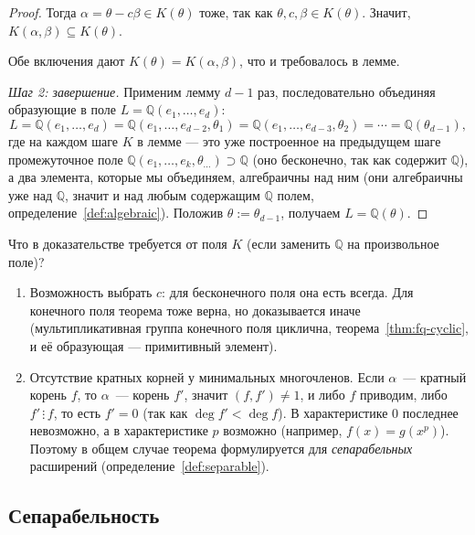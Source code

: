 \documentclass[12pt]{article}
\begin{document}
\begin{proof}
    	Тогда $\alpha = \theta-c\beta \in K(\theta)$ тоже, так как $\theta,c,\beta \in K(\theta)$. Значит, $K(\alpha,\beta)\subseteq K(\theta)$.
    
    	Обе включения дают $K(\theta)=K(\alpha,\beta)$, что и требовалось в лемме.
    
    	\smallskip
    	\emph{Шаг 2: завершение.} Применим лемму $d-1$ раз, последовательно объединяя образующие в поле $L=\mathbb{Q}(e_1,\ldots,e_d)$:
    	\[
    	L = \mathbb{Q}(e_1,\ldots,e_d) = \mathbb{Q}(e_1,\ldots,e_{d-2},\theta_1) = \mathbb{Q}(e_1,\ldots,e_{d-3},\theta_2) = \cdots = \mathbb{Q}(\theta_{d-1}),
    	\]
    	где на каждом шаге $K$ в лемме --- это уже построенное на предыдущем шаге промежуточное поле $\mathbb{Q}(e_1,\ldots,e_k,\theta_{\ldots})\supset\mathbb{Q}$ (оно бесконечно, так как содержит $\mathbb{Q}$), а два элемента, которые мы объединяем, алгебраичны над ним (они алгебраичны уже над $\mathbb{Q}$, значит и над любым содержащим $\mathbb{Q}$ полем, определение~\ref{def:algebraic}). Положив $\theta := \theta_{d-1}$, получаем $L = \mathbb{Q}(\theta)$.
    \end{proof}

    \begin{note}
    	Что в доказательстве требуется от поля $K$ (если заменить $\mathbb{Q}$ на произвольное поле)?
    	\begin{enumerate}
    		\item Возможность выбрать $c$: для бесконечного поля она есть всегда. Для конечного поля теорема тоже верна, но доказывается иначе (мультипликативная группа конечного поля циклична, теорема~\ref{thm:fq-cyclic}, и её образующая --- примитивный элемент).
    		\item Отсутствие кратных корней у минимальных многочленов. Если $\alpha$~--- кратный корень $f$, то $\alpha$~--- корень $f'$, значит $(f, f') \ne 1$, и либо $f$ приводим, либо $f' \,\vdots\, f$, то есть $f' = 0$ (так как $\deg f' < \deg f$). В характеристике $0$ последнее невозможно, а в характеристике $p$ возможно (например, $f(x) = g(x^p)$). Поэтому в общем случае теорема формулируется для \emph{сепарабельных} расширений (определение~\ref{def:separable}).
    	\end{enumerate}
    \end{note}
    
    \subsection{Сепарабельность}
    
\end{document}
